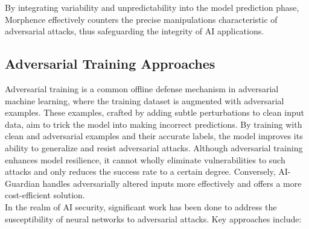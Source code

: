 \documentclass[letterpaper,twocolumn,10pt]{article}
\begin{document}
By integrating variability and unpredictability into the model prediction phase, Morphence effectively counters the precise manipulations characteristic of adversarial attacks, thus safeguarding the integrity of AI applications.



\subsection{Adversarial Training Approaches} 

Adversarial training is a common offline defense mechanism in adversarial machine learning, where the training dataset is augmented with adversarial examples. These examples, crafted by adding subtle perturbations to clean input data, aim to trick the model into making incorrect predictions. By training with clean and adversarial examples and their accurate labels, the model improves its ability to generalize and resist adversarial attacks. Although adversarial training enhances model resilience, it cannot wholly eliminate vulnerabilities to such attacks and only reduces the success rate to a certain degree. Conversely, AI-Guardian handles adversarially altered inputs more effectively and offers a more cost-efficient solution.\\

In the realm of AI security, significant work has been
done to address the susceptibility of neural networks to adversarial attacks. Key approaches include:
\end{document}
